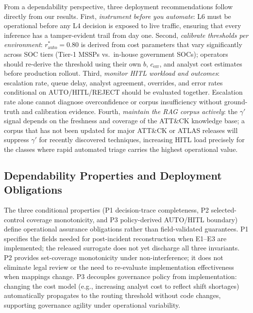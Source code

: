 \documentclass[journal]{IEEEtran}
\begin{document}
From a dependability perspective, three deployment recommendations follow directly from
our results. First, \emph{instrument before you automate}: L6 must be operational
before any L4 decision is exposed to live traffic, ensuring that every inference has a
tamper-evident trail from day one. Second, \emph{calibrate thresholds per environment}:
$r^*_{\text{auto}} = 0.80$ is derived from cost parameters that vary significantly
across SOC tiers (Tier-1 MSSPs vs.\ in-house government SOCs); operators should
re-derive the threshold using their own $b$, $c_{\text{err}}$, and analyst cost
estimates before production rollout. Third, \emph{monitor HITL workload and outcomes}:
escalation rate, queue delay, analyst agreement, overrides, and error rates conditional on
AUTO/HITL/REJECT should be evaluated together. Escalation rate alone cannot diagnose
overconfidence or corpus insufficiency without ground-truth and calibration evidence.
Fourth, \emph{maintain the RAG corpus actively}: the $\gamma'$ signal depends on the
freshness and coverage of the ATT\&CK knowledge base; a corpus that has not been updated
for major ATT\&CK or ATLAS releases will suppress $\gamma'$ for recently discovered
techniques, increasing HITL load precisely for the classes where rapid automated
triage carries the highest operational value.

\subsection{Dependability Properties and Deployment Obligations}
The three conditional properties (P1 decision-trace completeness, P2 selected-control
coverage monotonicity, and P3 policy-derived AUTO/HITL boundary) define operational
assurance obligations rather than field-validated guarantees.
P1 specifies the fields needed for post-incident reconstruction when E1--E3 are implemented;
the released surrogate does not yet discharge all three invariants.
P2 provides set-coverage monotonicity under non-interference; it does not eliminate legal
review or the need to re-evaluate implementation effectiveness when mappings change.
P3 decouples governance policy from implementation: changing the cost model
(e.g., increasing analyst cost to reflect shift shortages) automatically propagates
to the routing threshold without code changes, supporting governance agility under
operational variability.
\end{document}
